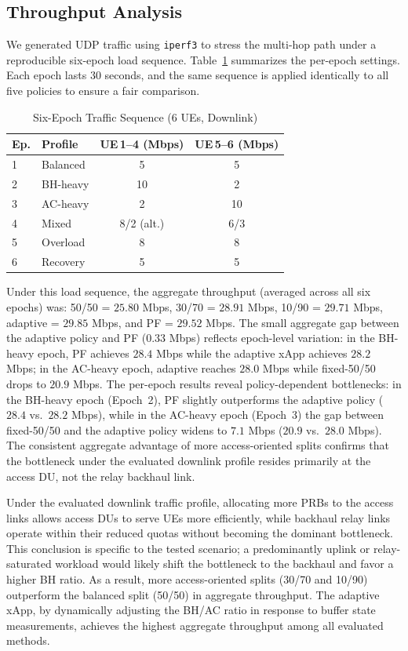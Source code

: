 \documentclass[conference, a4paper]{IEEEtran}
\begin{document}
\subsection{Throughput Analysis}
We generated UDP traffic using \texttt{iperf3} to stress the multi-hop path under a reproducible six-epoch load sequence. Table~\ref{tab:traffic} summarizes the per-epoch settings. Each epoch lasts 30 seconds, and the same sequence is applied identically to all five policies to ensure a fair comparison.

\begin{table}[htbp]
\caption{Six-Epoch Traffic Sequence (6 UEs, Downlink)}
\centering
\begin{tabular}{llcc}
\toprule
\textbf{Ep.} & \textbf{Profile} & \textbf{UE\,1--4 (Mbps)} & \textbf{UE\,5--6 (Mbps)} \\
\midrule
1 & Balanced  & 5  & 5  \\
2 & BH-heavy  & 10 & 2  \\
3 & AC-heavy  & 2  & 10 \\
4 & Mixed     & 8/2 (alt.) & 6/3 \\
5 & Overload  & 8  & 8  \\
6 & Recovery  & 5  & 5  \\
\bottomrule
\end{tabular}
\label{tab:traffic}
\end{table}

Under this load sequence, the aggregate throughput (averaged across all six epochs) was: 50/50 = $25.80$ Mbps, 30/70 = $28.91$ Mbps, 10/90 = $29.71$ Mbps, adaptive = $29.85$ Mbps, and PF = $29.52$ Mbps. The small aggregate gap between the adaptive policy and PF ($0.33$ Mbps) reflects epoch-level variation: in the BH-heavy epoch, PF achieves $28.4$ Mbps while the adaptive xApp achieves $28.2$ Mbps; in the AC-heavy epoch, adaptive reaches $28.0$ Mbps while fixed-50/50 drops to $20.9$ Mbps. The per-epoch results reveal policy-dependent bottlenecks: in the BH-heavy epoch (Epoch~2), PF slightly outperforms the adaptive policy ($28.4$ vs.\ $28.2$ Mbps), while in the AC-heavy epoch (Epoch~3) the gap between fixed-50/50 and the adaptive policy widens to $7.1$ Mbps ($20.9$ vs.\ $28.0$ Mbps). The consistent aggregate advantage of more access-oriented splits confirms that the bottleneck under the evaluated downlink profile resides primarily at the access DU, not the relay backhaul link.

Under the evaluated downlink traffic profile, allocating more PRBs to the access links allows access DUs to serve UEs more efficiently, while backhaul relay links operate within their reduced quotas without becoming the dominant bottleneck. This conclusion is specific to the tested scenario; a predominantly uplink or relay-saturated workload would likely shift the bottleneck to the backhaul and favor a higher BH ratio. As a result, more access-oriented splits (30/70 and 10/90) outperform the balanced split (50/50) in aggregate throughput. The adaptive xApp, by dynamically adjusting the BH/AC ratio in response to buffer state measurements, achieves the highest aggregate throughput among all evaluated methods.
\end{document}
